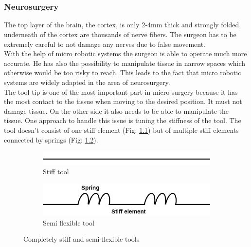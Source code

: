 \chapter{}
\label{sec:current_applications}
\subsection{Neurosurgery}
\label{sec:Neurosurgery}
The top layer of the brain, the cortex, is only 2-4mm thick and strongly folded, underneath of the cortex are thousands of nerve fibers. The surgeon has to be extremely careful to not damage any nerves due to false movement. \\
With the help of micro robotic systems the surgeon is able to operate much more accurate. He has also the possibility to manipulate tissue in narrow spaces which otherwise would be too risky to reach. This leads to the fact that micro robotic systems are widely adapted in the area of neurosurgery.\\
The tool tip is one of the most important part in micro surgery because it has the most contact to the tissue when moving to the desired position. It must not damage tissue. On the other side it also needs to be able to manipulate the tissue. One approach to handle this issue is tuning the stiffness of the tool. The tool doesn't consist of one stiff element (Fig: \ref{fig:stifftool}) but of multiple stiff elements connected by springs (Fig: \ref{fig:bendabletool}).
\begin{figure}[H]
    \centering
    \begin{subfigure}[b]{0.45\textwidth}
        \includegraphics[width=\textwidth]{Figures/stiff_element.png}
        \caption{Stiff tool}
        \label{fig:stifftool}
    \end{subfigure}
    \qquad
    \begin{subfigure}[b]{0.45\textwidth}
        \includegraphics[width=\textwidth]{Figures/spring_element.png}
        \caption{Semi flexible tool}
        \label{fig:bendabletool}
    \end{subfigure}
    \caption{Completely stiff and semi-flexible tools}\label{fig:logos}
\end{figure}
